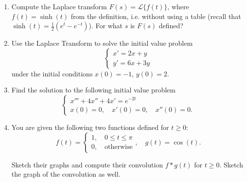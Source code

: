 \documentclass[11 pt]{article}
\newcommand{\calL}{\mathcal{L}}
\begin{document}
\begin{enumerate}

\item  Compute the Laplace transform $F(s)=\calL\{f(t)\}$, where $f(t)=\sinh(t)$ from the definition, i.e. without using a table (recall that $\sinh(t)=\frac{1}{2}(e^t-e^{-t})$).
For what $s$ is $F(s)$ defined?


\item  Use the Laplace Transform to solve the initial value problem
\begin{equation}
    \begin{cases}
        x'=2x+y\\
        y'=6x+3y
    \end{cases}
\end{equation}
under the initial conditions $x(0)=-1$, $y(0)=2$.









    \item  Find the solution to the following initial value problem
    \begin{equation}
        \begin{cases}
          x'''+4x''+4x'=e^{-2t}\\
          x(0)=0,\quad x'(0)=0, \quad x''(0)=0.  
        \end{cases}
    \end{equation}





\item You are given the following two functions defined for $t\geq 0$:
\begin{equation}
    f(t)=\begin{cases}
        1, \quad 0\leq t\leq\pi\\
        0, \quad \text{otherwise}
    \end{cases}, \quad g(t)=\cos(t).
\end{equation}

Sketch their graphs and compute their convolution $f*g(t)$ for $t\geq 0$. Sketch the graph of the convolution as well.




\end{enumerate}
\end{document}
